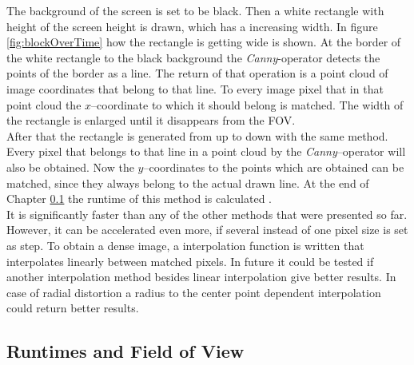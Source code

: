 \documentclass[journal,final,a4paper,twoside]{PS}
\begin{document}
The background of the screen is set to be black. Then a white rectangle with height of the screen height is drawn, which has a increasing width. In figure \ref{fig:blockOverTime} how the rectangle is getting wide is shown. At the border of the white rectangle to the black background the \emph{Canny}-operator detects the points of the border as a line. The return of that operation is a point cloud of image coordinates that belong to that line. To every image pixel that in that point cloud the $x$--coordinate to which it should belong is matched. The width of the rectangle is enlarged until it disappears from the FOV.\\
After that the rectangle is generated from up to down with the same method. Every pixel that belongs to that line in a point cloud by the \emph{Canny}--operator will also be obtained. Now the $y$--coordinates to the points which are obtained can be matched, since they always belong to the actual drawn line. At the end of Chapter \ref{sec:runtime} the runtime of this method is calculated .\\
It is significantly faster than any of the other methods that were presented so far. However, it can be accelerated even more, if several instead of one pixel size is set as step. To obtain a dense image, a interpolation function is written that interpolates linearly between matched pixels. In future it could be tested if another interpolation method besides linear interpolation give better results. In case of radial distortion a radius to the center point dependent interpolation could return better results.\\

\subsection{Runtimes and Field of View}
\label{sec:runtime}
\end{document}
